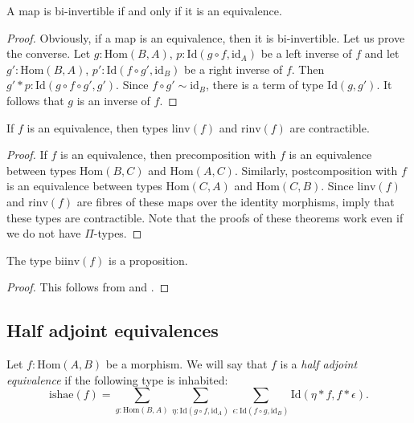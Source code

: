 \documentclass[reqno]{mscs}
\newcommand{\fs}[1]{\mathrm{#1}}
\newcommand{\Hom}{\fs{Hom}}
\newcommand{\Id}{\fs{Id}}
\newcommand{\id}{\fs{id}}
\numberwithin{figure}{section}
\begin{document}
\begin{prop}
A map is bi-invertible if and only if it is an equivalence.
\end{prop}
\begin{proof}
Obviously, if a map is an equivalence, then it is bi-invertible.
Let us prove the converse.
Let $g : \Hom(B,A)$, $p : \Id(g \circ f, \id_A)$ be a left inverse of $f$ and let $g' : \Hom(B,A)$, $p' : \Id(f \circ g', \id_B)$ be a right inverse of $f$.
Then $g' * p : \Id(g \circ f \circ g', g')$.
Since $f \circ g' \sim \id_B$, there is a term of type $\Id(g,g')$.
It follows that $g$ is an inverse of $f$.
\end{proof}

\begin{lem}
If $f$ is an equivalence, then types $\fs{linv}(f)$ and $\fs{rinv}(f)$ are contractible.
\end{lem}
\begin{proof}
If $f$ is an equivalence, then precomposition with $f$ is an equivalence between types $\Hom(B,C)$ and $\Hom(A,C)$.
Similarly, postcomposition with $f$ is an equivalence between types $\Hom(C,A)$ and $\Hom(C,B)$.
Since $\fs{linv}(f)$ and $\fs{rinv}(f)$ are fibres of these maps over the identity morphisms, \cite[Theorem~4.2.3 and Theorem~4.2.6]{hottbook} imply that these types are contractible.
Note that the proofs of these theorems work even if we do not have $\Pi$-types.
\end{proof}

\begin{prop}
The type $\fs{biinv}(f)$ is a proposition.
\end{prop}
\begin{proof}
This follows from  and .
\end{proof}

\subsection{Half adjoint equivalences}

Let $f : \Hom(A,B)$ be a morphism.
We will say that $f$ is a \emph{half adjoint equivalence} if the following type is inhabited:
\[ \fs{ishae}(f) = \sum_{g : \Hom(B,A)} \sum_{\eta : \Id(g \circ f, \id_A)} \sum_{\epsilon : \Id(f \circ g, \id_B)} \Id(\eta * f, f * \epsilon). \]
\end{document}
